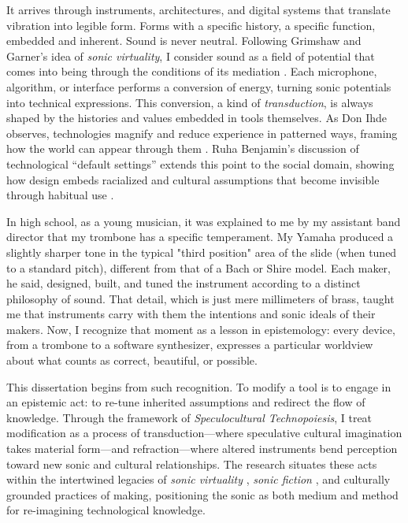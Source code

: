  It arrives through instruments, architectures, and digital systems that translate vibration into legible form. Forms with a specific history, a specific function, embedded and inherent. Sound is never neutral. Following Grimshaw and Garner’s idea of \textit{sonic virtuality}, I consider sound as a field of potential that comes into being through the conditions of its mediation \parencite{Grimshaw_Garner_2015}. Each microphone, algorithm, or interface performs a conversion of energy, turning sonic potentials into technical expressions. This conversion, a kind of \textit{transduction}, is always shaped by the histories and values embedded in tools themselves. As Don Ihde observes, technologies magnify and reduce experience in patterned ways, framing how the world can appear through them \parencite{Ihde_1990}. Ruha Benjamin’s discussion of technological “default settings” extends this point to the social domain, showing how design embeds racialized and cultural assumptions that become invisible through habitual use \parencite{Benjamin_2019a}.

In high school, as a young musician, it was explained to me by my assistant band director that my trombone has a specific temperament. My Yamaha produced a slightly sharper tone in the typical "third position" area of the slide (when tuned to a standard pitch), different from that of a Bach or Shire model. Each maker, he said, designed, built, and tuned the instrument according to a distinct philosophy of sound. That detail, which is just mere millimeters of brass, taught me that instruments carry with them the intentions and sonic ideals of their makers. Now, I recognize that moment as a lesson in epistemology: every device, from a trombone to a software synthesizer, expresses a particular worldview about what counts as correct, beautiful, or possible.

This dissertation begins from such recognition. To modify a tool is to engage in an epistemic act: to re-tune inherited assumptions and redirect the flow of knowledge. Through the framework of \textit{Speculocultural Technopoiesis}, I treat modification as a process of transduction—where speculative cultural imagination takes material form—and refraction—where altered instruments bend perception toward new sonic and cultural relationships. The research situates these acts within the intertwined legacies of \textit{sonic virtuality} \parencite{Grimshaw_Garner_2015}, \textit{sonic fiction} \parencite{Eshun_1999}, and culturally grounded practices of making, positioning the sonic as both medium and method for re-imagining technological knowledge.



